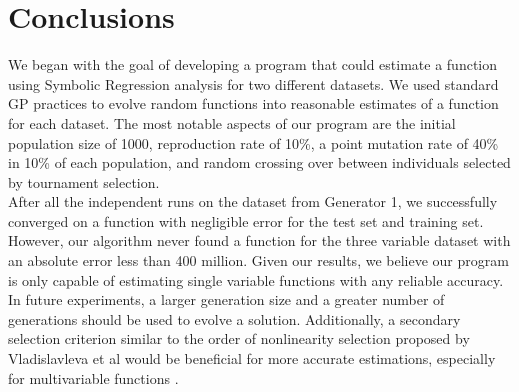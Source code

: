 \section{Conclusions}
\label{sec:concl}

We began with the goal of developing a program that could estimate a
function using Symbolic Regression analysis for two different
datasets. We used standard GP practices to evolve
random functions into reasonable estimates of a function for each
dataset. The most notable aspects of our program are the initial
population size of 1000, reproduction rate of 10\%, a point
mutation rate of 40\% in 10\% of each population, and random crossing
over between individuals selected by tournament selection.\\

After all the independent runs on the dataset from Generator 1, we successfully
converged on a function with negligible error for the test set and
training set. However, our algorithm never found a function for
the three variable dataset with an absolute error less than 400
million. Given our results, we
believe our program is only capable of estimating single variable
functions with any reliable accuracy. \\

In future experiments, a larger generation size and a greater number of generations should be used to evolve a solution. Additionally, a secondary selection criterion similar to the order of nonlinearity selection proposed by Vladislavleva et al would be beneficial for more accurate estimations, especially for multivariable functions \cite{Vladislavleva:2009:ONC:1650356.1650365}.